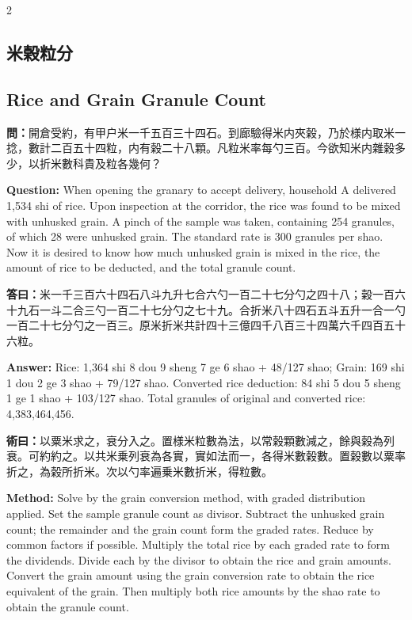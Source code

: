 \documentclass[11pt,a4paper]{article}
\newcommand{\QuestionText}[1]{\par\noindent\textbf{\color{problemcolor}問：}#1\par}
\newcommand{\AnswerText}[1]{\par\noindent\textbf{\color{answercolor}答曰：}#1\par}
\newcommand{\MethodText}[1]{\par\noindent\textbf{\color{methodcolor}術曰：}#1\par}
\newcommand{\QuestionEn}[1]{\par\noindent\textbf{\color{problemcolor}Question:} #1\par}
\newcommand{\AnswerEn}[1]{\par\noindent\textbf{\color{answercolor}Answer:} #1\par}
\newcommand{\MethodEn}[1]{\par\noindent\textbf{\color{methodcolor}Method:} #1\par}
\begin{document}
\begin{paracol}{2}

\subsection*{\color{sectioncolor}米榖粒分}
\switchcolumn
\subsection*{\color{sectioncolor}Rice and Grain Granule Count}
\switchcolumn*

\QuestionText{開倉受約，有甲户米一千五百三十四石。到廊驗得米内夾榖，乃於様内取米一捻，數計二百五十四粒，内有榖二十八顆。凡粒米率每勺三百。今欲知米内雜榖多少，以折米數科貴及粒各幾何？}
\switchcolumn
\QuestionEn{When opening the granary to accept delivery, household A delivered 1,534 shi of rice. Upon inspection at the corridor, the rice was found to be mixed with unhusked grain. A pinch of the sample was taken, containing 254 granules, of which 28 were unhusked grain. The standard rate is 300 granules per shao. Now it is desired to know how much unhusked grain is mixed in the rice, the amount of rice to be deducted, and the total granule count.}
\switchcolumn*

\AnswerText{米一千三百六十四石八斗九升七合六勺一百二十七分勺之四十八；榖一百六十九石一斗二合三勺一百二十七分勺之七十九。合折米八十四石五斗五升一合一勺一百二十七分勺之一百三。原米折米共計四十三億四千八百三十四萬六千四百五十六粒。}
\switchcolumn
\AnswerEn{Rice: 1,364 shi 8 dou 9 sheng 7 ge 6 shao + 48/127 shao; Grain: 169 shi 1 dou 2 ge 3 shao + 79/127 shao. Converted rice deduction: 84 shi 5 dou 5 sheng 1 ge 1 shao + 103/127 shao. Total granules of original and converted rice: 4,383,464,456.}
\switchcolumn*

\MethodText{以粟米求之，衰分入之。置様米粒數為法，以常榖顆數減之，餘與榖為列衰。可約約之。以共米乗列衰為各實，實如法而一，各得米數榖數。置榖數以粟率折之，為榖所折米。次以勺率遍乗米數折米，得粒數。}
\switchcolumn
\MethodEn{Solve by the grain conversion method, with graded distribution applied. Set the sample granule count as divisor. Subtract the unhusked grain count; the remainder and the grain count form the graded rates. Reduce by common factors if possible. Multiply the total rice by each graded rate to form the dividends. Divide each by the divisor to obtain the rice and grain amounts. Convert the grain amount using the grain conversion rate to obtain the rice equivalent of the grain. Then multiply both rice amounts by the shao rate to obtain the granule count.}
\switchcolumn*


\end{paracol}
\end{document}
